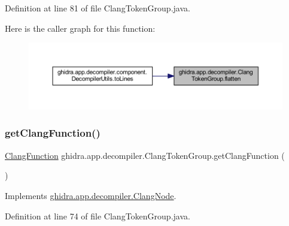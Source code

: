 Definition at line 81 of file Clang\+Token\+Group.\+java.

Here is the caller graph for this function\+:
\nopagebreak
\begin{figure}[H]
\begin{center}
\leavevmode
\includegraphics[width=350pt]{classghidra_1_1app_1_1decompiler_1_1_clang_token_group_ac469bdd22ba48a2941a40779f2e4630a_icgraph}
\end{center}
\end{figure}
\mbox{\label{classghidra_1_1app_1_1decompiler_1_1_clang_token_group_a19473d47a4c0e53a664798541388518a}} 
\subsubsection{\texorpdfstring{getClangFunction()}{getClangFunction()}}
{\footnotesize\ttfamily \mbox{\hyperlink{classghidra_1_1app_1_1decompiler_1_1_clang_function}{Clang\+Function}} ghidra.\+app.\+decompiler.\+Clang\+Token\+Group.\+get\+Clang\+Function (\begin{DoxyParamCaption}{ }\end{DoxyParamCaption})\hspace{0.3cm}{\ttfamily [inline]}}



Implements \mbox{\hyperlink{interfaceghidra_1_1app_1_1decompiler_1_1_clang_node_a715989d3fa33942a85517fae04a70ac0}{ghidra.\+app.\+decompiler.\+Clang\+Node}}.



Definition at line 74 of file Clang\+Token\+Group.\+java.

